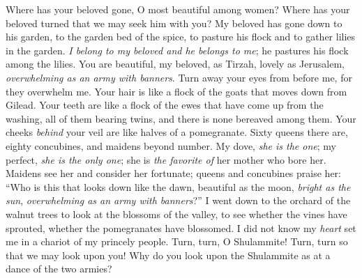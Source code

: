 \begin{biblechapter} %
\verse Where has your beloved gone, 
O most beautiful among women? 
Where has your beloved turned 
that we may seek him with you?
\verse My beloved has gone down to his garden, 
to the garden bed of the spice, 
to pasture his flock and to gather lilies in the garden.
 \textit{I belong to my beloved and he belongs to me}; 
he pastures his flock among the lilies.
 You are beautiful, my beloved, as Tirzah, 
lovely as Jerusalem, 
\textit{overwhelming as an army with banners}.
\verse Turn away your eyes from before me, 
for they overwhelm me. 
Your hair is like a flock of the goats 
that moves down from Gilead.
\verse Your teeth are like a flock of the ewes 
that have come up from the washing, 
all of them bearing twins, 
and there is none bereaved among them.
\verse Your cheeks \textit{behind} your veil 
are like halves of a pomegranate.
 Sixty queens there are, eighty concubines, 
and maidens beyond number.
\verse My dove, \textit{she is the one}; 
my perfect, \textit{she is the only one}; 
she is \textit{the favorite of} her mother who bore her. 
Maidens see her and consider her fortunate; 
queens and concubines praise her:
\verse “Who is this that looks down like the dawn, 
beautiful as the moon, 
\textit{bright as the sun}, 
\textit{overwhelming as an army with banners}?”
 I went down to the orchard of the walnut trees 
to look at the blossoms of the valley, 
to see whether the vines have sprouted, 
whether the pomegranates have blossomed.
\verse I did not know my \textit{heart} set me 
in a chariot of my princely people.
\verse  Turn, turn, O Shulammite! 
Turn, turn so that we may look upon you! 
Why do you look upon the Shulammite 
as at a dance of the two armies?
\end{biblechapter}

